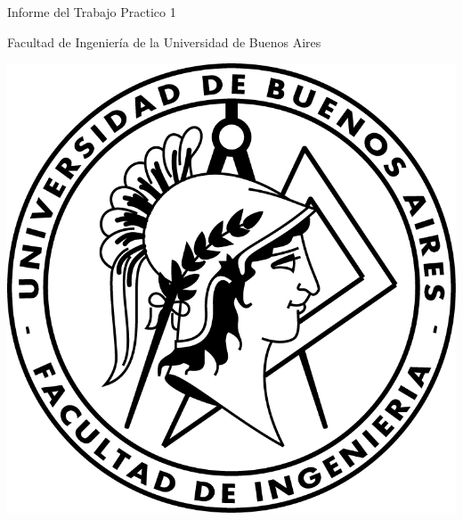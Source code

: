 \documentclass{article}
\begin{document}
\begin{titlepage}
  \vspace*{1cm}

  \begin{center}
    {\Huge{Informe del Trabajo Practico 1}}
  \end{center}

  \vspace{0.4cm}

  \begin{center}
    {\LARGE{Facultad de Ingeniería de la Universidad de Buenos Aires}}\\
    \vspace{0.3cm}
  \end{center}

  \vspace{0.8cm}
  \begin{center}
    \includegraphics[scale=0.8]{Logo-fiuba}
  \end{center}


\end{titlepage}
\end{document}
